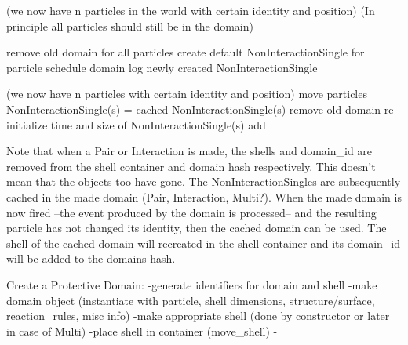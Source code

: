 \documentclass[a4paper, 11pt]{article}
\begin{document}
  (we now have n particles in the world with certain identity and position)
  (In principle all particles should still be in the domain)

  remove old domain 
  for all particles
    create default NonInteractionSingle for particle
    schedule domain
    log newly created NonInteractionSingle



    (we now have n particles with certain identity and position)
    move particles
    NonInteractionSingle(s) = cached NonInteractionSingle(s)
    remove old domain
    re-initialize time and size of NonInteractionSingle(s)
    add 




Note that when a Pair or Interaction is made, the shells and domain\_id are removed from the shell container and
domain hash respectively. This doesn't mean that the objects too have gone. The NonInteractionSingles are subsequently
cached in the made domain (Pair, Interaction, Multi?). When the made domain is now fired --the event produced by the
domain is processed-- and the resulting particle has not changed its identity, then the cached domain can be used. The
shell of the cached domain will recreated in the shell container and its domain\_id will be added to the domains hash.



Create a Protective Domain:
-generate identifiers for domain and shell
-make domain object (instantiate with particle, shell dimensions, structure/surface, reaction\_rules, misc info)
 -make appropriate shell (done by constructor or later in case of Multi)
-place shell in container (move\_shell)
-
\end{document}
